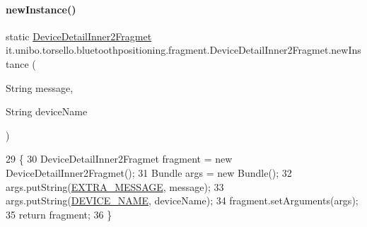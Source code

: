 \paragraph{\texorpdfstring{new\+Instance()}{newInstance()}}
{\footnotesize\ttfamily static \hyperlink{classit_1_1unibo_1_1torsello_1_1bluetoothpositioning_1_1fragment_1_1DeviceDetailInner2Fragmet}{Device\+Detail\+Inner2\+Fragmet} it.\+unibo.\+torsello.\+bluetoothpositioning.\+fragment.\+Device\+Detail\+Inner2\+Fragmet.\+new\+Instance (\begin{DoxyParamCaption}\item[{String}]{message,  }\item[{String}]{device\+Name }\end{DoxyParamCaption})\hspace{0.3cm}{\ttfamily [static]}}


\begin{DoxyCode}
29                                                                                            \{
30         DeviceDetailInner2Fragmet fragment = \textcolor{keyword}{new} DeviceDetailInner2Fragmet();
31         Bundle args = \textcolor{keyword}{new} Bundle();
32         args.putString(\hyperlink{classit_1_1unibo_1_1torsello_1_1bluetoothpositioning_1_1fragment_1_1DeviceDetailInner2Fragmet_a2980d3d81aa246caa72f182a8c2ccb11_a2980d3d81aa246caa72f182a8c2ccb11}{EXTRA\_MESSAGE}, message);
33         args.putString(\hyperlink{classit_1_1unibo_1_1torsello_1_1bluetoothpositioning_1_1fragment_1_1DeviceDetailInner2Fragmet_a8e8968fb34c3ad56d582196879b0ef6c_a8e8968fb34c3ad56d582196879b0ef6c}{DEVICE\_NAME}, deviceName);
34         fragment.setArguments(args);
35         \textcolor{keywordflow}{return} fragment;
36     \}
\end{DoxyCode}
\hypertarget{classit_1_1unibo_1_1torsello_1_1bluetoothpositioning_1_1fragment_1_1DeviceDetailInner2Fragmet_ae07630a3636c3acb7b0f353d54a7f816_ae07630a3636c3acb7b0f353d54a7f816}{}\label{classit_1_1unibo_1_1torsello_1_1bluetoothpositioning_1_1fragment_1_1DeviceDetailInner2Fragmet_ae07630a3636c3acb7b0f353d54a7f816_ae07630a3636c3acb7b0f353d54a7f816} 
